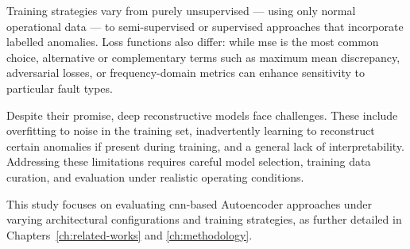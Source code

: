 Training strategies vary from purely unsupervised — using only normal operational data — to semi-supervised or supervised approaches that incorporate labelled anomalies. 
Loss functions also differ: while \gls{mse} is the most common choice, alternative or complementary terms such as maximum mean discrepancy, adversarial losses, or frequency-domain metrics can enhance sensitivity to particular fault types.

Despite their promise, deep reconstructive models face challenges.
These include overfitting to noise in the training set, inadvertently learning to reconstruct certain anomalies if present during training, and a general lack of interpretability. 
Addressing these limitations requires careful model selection, training data curation, and evaluation under realistic operating conditions.

This study focuses on evaluating \gls{cnn}-based Autoencoder approaches under varying architectural configurations and training strategies, as further detailed in Chapters~\ref{ch:related-works} and \ref{ch:methodology}.
